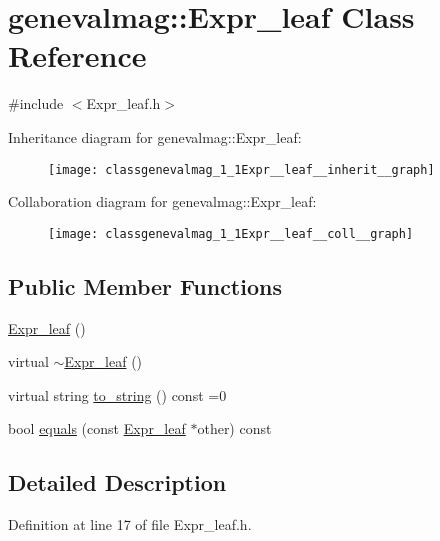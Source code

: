 \hypertarget{classgenevalmag_1_1Expr__leaf}{
\section{genevalmag::Expr\_\-leaf Class Reference}
\label{classgenevalmag_1_1Expr__leaf}
}


{\ttfamily \#include $<$Expr\_\-leaf.h$>$}



Inheritance diagram for genevalmag::Expr\_\-leaf:\nopagebreak
\begin{figure}[H]
\begin{center}
\leavevmode
\texttt{[image: classgenevalmag\_1\_1Expr\_\_leaf\_\_inherit\_\_graph]}
\end{center}
\end{figure}


Collaboration diagram for genevalmag::Expr\_\-leaf:\nopagebreak
\begin{figure}[H]
\begin{center}
\leavevmode
\texttt{[image: classgenevalmag\_1\_1Expr\_\_leaf\_\_coll\_\_graph]}
\end{center}
\end{figure}
\subsection*{Public Member Functions}
\begin{DoxyCompactItemize}
\item 
\hyperlink{classgenevalmag_1_1Expr__leaf_a5deba73ccc015e6c1d926b9d11fbefb5}{Expr\_\-leaf} ()
\item 
virtual \hyperlink{classgenevalmag_1_1Expr__leaf_a435c12ce45debdded6be221b0da68c7e}{$\sim$Expr\_\-leaf} ()
\item 
virtual string \hyperlink{classgenevalmag_1_1Expr__leaf_a96854f59a155b173b6e79007d87bdad5}{to\_\-string} () const =0
\item 
bool \hyperlink{classgenevalmag_1_1Expr__leaf_a115a2d203c018eab86e8973b610f7d28}{equals} (const \hyperlink{classgenevalmag_1_1Expr__leaf}{Expr\_\-leaf} $\ast$other) const 
\end{DoxyCompactItemize}


\subsection{Detailed Description}


Definition at line 17 of file Expr\_\-leaf.h.



